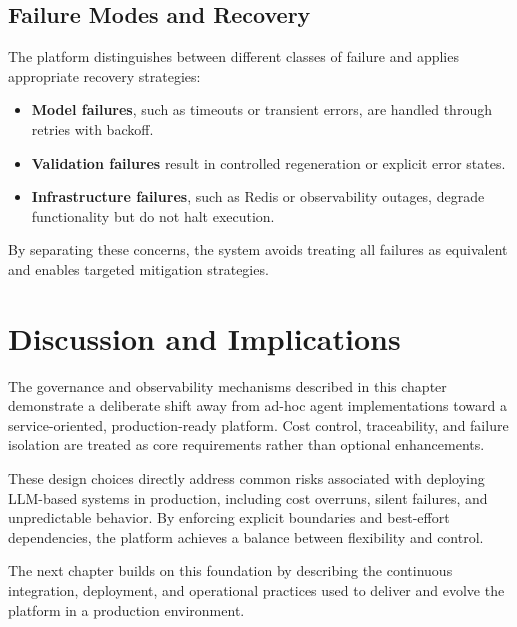 \subsection{Failure Modes and Recovery}
\label{sec:FailureRecovery}

The platform distinguishes between different classes of failure and applies
appropriate recovery strategies:

\begin{itemize}
      \item \textbf{Model failures}, such as timeouts or transient errors, are
            handled through retries with backoff.
      \item \textbf{Validation failures} result in controlled regeneration or
            explicit error states.
      \item \textbf{Infrastructure failures}, such as Redis or observability
            outages, degrade functionality but do not halt execution.
\end{itemize}

By separating these concerns, the system avoids treating all failures as
equivalent and enables targeted mitigation strategies.

\section{Discussion and Implications}
\label{sec:GovernanceDiscussion}

The governance and observability mechanisms described in this chapter
demonstrate a deliberate shift away from ad-hoc agent implementations toward a
service-oriented, production-ready platform. Cost control, traceability, and
failure isolation are treated as core requirements rather than optional
enhancements.

These design choices directly address common risks associated with deploying
LLM-based systems in production, including cost overruns, silent failures, and
unpredictable behavior. By enforcing explicit boundaries and best-effort
dependencies, the platform achieves a balance between flexibility and control.

The next chapter builds on this foundation by describing the continuous
integration, deployment, and operational practices used to deliver and evolve
the platform in a production environment.

